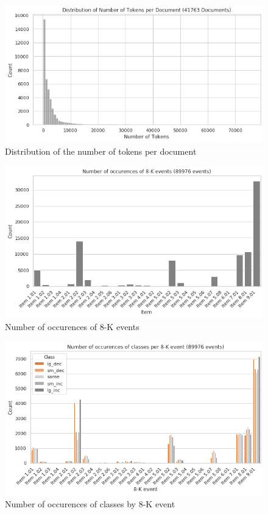 \documentclass{article}
\begin{document}
	\begin{figure}[h!]
		\includegraphics[width=\linewidth]{img/dist_num_tokens.png}
		\caption{Distribution of the number of tokens per document}
		\label{fig:dist_num_tokens}
	\end{figure}

	\begin{figure}[h!]
		\includegraphics[width=\linewidth]{img/dist_8k_events.png}
		\caption{Number of occurences of 8-K events}
		\label{fig:dist_8k_events}
	\end{figure}
	
	\begin{figure}[h!]
		\includegraphics[width=\linewidth]{img/dist_class_by_8k.png}
		\caption{Number of occurences of classes by 8-K event}
		\label{fig:dist_class_by_8k}
	\end{figure}
\end{document}
